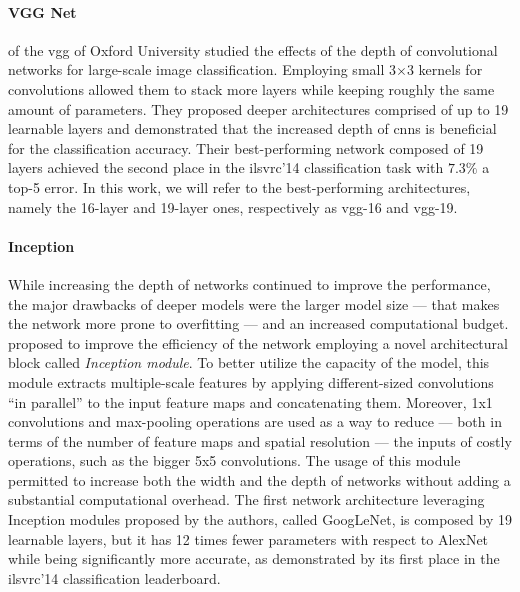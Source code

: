 \paragraph{VGG Net} %
\citet{simonyan2014very} of the \gls{vgg} of Oxford University studied the effects of the depth of convolutional networks for large-scale image classification.
Employing small 3$\times$3 kernels for convolutions allowed them to stack more layers while keeping roughly the same amount of parameters.
They proposed deeper architectures comprised of up to 19 learnable layers and demonstrated that the increased depth of \glspl{cnn} is beneficial for the classification accuracy.
Their best-performing network composed of 19 layers achieved the second place in the \gls{ilsvrc}'14 classification task with $7.3 \%$ a top-5 error.
In this work, we will refer to the best-performing architectures, namely the 16-layer and 19-layer ones, respectively as \gls{vgg}-16 and \gls{vgg}-19.

\paragraph{Inception}
While increasing the depth of networks continued to improve the performance, the major drawbacks of deeper models were the larger model size --- that makes the network more prone to overfitting --- and an increased computational budget.
\citet{szegedy2015going} proposed to improve the efficiency of the network employing a novel architectural block called \emph{Inception module}.
To better utilize the capacity of the model, this module extracts multiple-scale features by applying different-sized convolutions ``in parallel'' to the input feature maps and concatenating them.
Moreover, 1x1 convolutions and max-pooling operations are used as a way to reduce --- both in terms of the number of feature maps and spatial resolution --- the inputs of costly operations, such as the bigger 5x5 convolutions.
The usage of this module permitted to increase both the width and the depth of networks without adding a substantial computational overhead.
The first network architecture leveraging Inception modules proposed by the authors, called GoogLeNet, is composed by 19 learnable layers, but it has 12 times fewer parameters with respect to AlexNet while being significantly more accurate, as demonstrated by its first place in the \gls{ilsvrc}'14 classification leaderboard.


